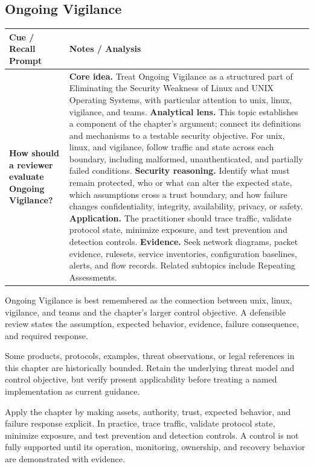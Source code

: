 \documentclass[11pt]{article}
\newcommand{\CornellHeader}{%
\rowcolor{Navy}\color{white}\bfseries Cue / Recall Prompt & \color{white}\bfseries Notes / Analysis\\\hline}
\newcommand{\CornellRow}[2]{%
\cellcolor{CueGray}\RaggedRight\textbf{#1} & \RaggedRight #2\\\hline}
\begin{document}
\subsection*{Ongoing Vigilance}
\begin{longtable}{>{\RaggedRight\arraybackslash}p{}|>{\RaggedRight\arraybackslash}p{}}
\CornellHeader
\CornellRow{How should a reviewer evaluate Ongoing Vigilance?}{\textbf{Core idea.} Treat Ongoing Vigilance as a structured part of Eliminating the Security Weakness of Linux and UNIX Operating Systems, with particular attention to unix, linux, vigilance, and teams. \textbf{Analytical lens.} This topic establishes a component of the chapter's argument; connect its definitions and mechanisms to a testable security objective. For unix, linux, and vigilance, follow traffic and state across each boundary, including malformed, unauthenticated, and partially failed conditions. \textbf{Security reasoning.} Identify what must remain protected, who or what can alter the expected state, which assumptions cross a trust boundary, and how failure changes confidentiality, integrity, availability, privacy, or safety. \textbf{Application.} The practitioner should trace traffic, validate protocol state, minimize exposure, and test prevention and detection controls. \textbf{Evidence.} Seek network diagrams, packet evidence, rulesets, service inventories, configuration baselines, alerts, and flow records. Related subtopics include Repeating Assessments.}
\end{longtable}
\begin{topicsummary}
Ongoing Vigilance is best remembered as the connection between unix, linux, vigilance, and teams and the chapter's larger control objective. A defensible review states the assumption, expected behavior, evidence, failure consequence, and required response.
\end{topicsummary}
\begin{historybox}
Some products, protocols, examples, threat observations, or legal references in this chapter are historically bounded. Retain the underlying threat model and control objective, but verify present applicability before treating a named implementation as current guidance.
\end{historybox}
\begin{defensebox}
Apply the chapter by making assets, authority, trust, expected behavior, and failure response explicit. In practice, trace traffic, validate protocol state, minimize exposure, and test prevention and detection controls. A control is not fully supported until its operation, monitoring, ownership, and recovery behavior are demonstrated with evidence.
\end{defensebox}
\end{document}
